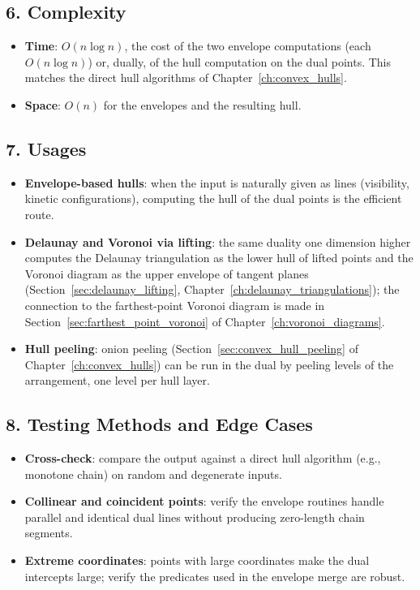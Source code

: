 \subsection{6. Complexity}

\begin{itemize}
\item \textbf{Time}: $O(n \log n)$, the cost of the two envelope
  computations (each $O(n \log n)$) or, dually, of the hull computation on
  the dual points. This matches the direct hull algorithms of
  Chapter~\ref{ch:convex_hulls}.
\item \textbf{Space}: $O(n)$ for the envelopes and the resulting hull.
\end{itemize}

\subsection{7. Usages}

\begin{itemize}
\item \textbf{Envelope-based hulls}: when the input is naturally given as
  lines (visibility, kinetic configurations), computing the hull of the dual
  points is the efficient route.
\item \textbf{Delaunay and Voronoi via lifting}: the same duality one
  dimension higher computes the Delaunay triangulation as the lower hull of
  lifted points and the Voronoi diagram as the upper envelope of tangent
  planes (Section~\ref{sec:delaunay_lifting}, Chapter~\ref{ch:delaunay_triangulations});
  the connection to the farthest-point Voronoi diagram is made in
  Section~\ref{sec:farthest_point_voronoi} of Chapter~\ref{ch:voronoi_diagrams}.
\item \textbf{Hull peeling}: onion peeling (Section~\ref{sec:convex_hull_peeling}
  of Chapter~\ref{ch:convex_hulls}) can be run in the dual by peeling levels
  of the arrangement, one level per hull layer.
\end{itemize}

\subsection{8. Testing Methods and Edge Cases}

\begin{itemize}
\item \textbf{Cross-check}: compare the output against a direct hull
  algorithm (e.g., monotone chain) on random and degenerate inputs.
\item \textbf{Collinear and coincident points}: verify the envelope
  routines handle parallel and identical dual lines without producing
  zero-length chain segments.
\item \textbf{Extreme coordinates}: points with large coordinates make the
  dual intercepts large; verify the predicates used in the envelope merge
  are robust.
\end{itemize}

